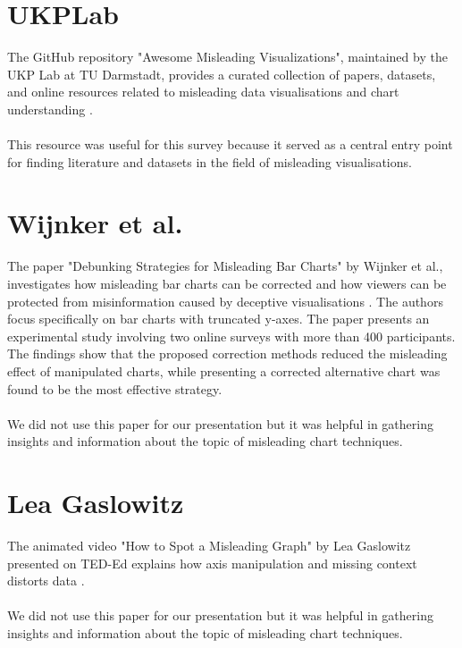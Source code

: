 \section{UKPLab}
The GitHub repository "Awesome Misleading Visualizations", maintained by the UKP Lab at TU Darmstadt, provides a curated collection of papers, datasets, and online resources related to misleading data visualisations and chart understanding \cite{UKPLab2025}. 
\\\\
This resource was useful for this survey because it served as a central entry point for finding literature and datasets in the field of misleading visualisations.

\section{Wijnker et al.}
The paper "Debunking Strategies for Misleading Bar Charts" by Wijnker et al., investigates how misleading bar charts can be corrected and how viewers can be protected from misinformation caused by deceptive visualisations \cite{Wijnker2022}. The authors focus specifically on bar charts with truncated y-axes.
The paper presents an experimental study involving two online surveys with more than 400 participants. The findings show that the proposed correction methods reduced the misleading effect of manipulated charts, while presenting a corrected alternative chart was found to be the most effective strategy.
\\\\
We did not use this paper for our presentation but it was helpful in gathering insights and information about the topic of misleading chart techniques.


\section{Lea Gaslowitz}
The animated video "How to Spot a Misleading Graph" by Lea Gaslowitz presented on TED-Ed explains how axis manipulation and missing context distorts data \cite{Gaslowitz2017}. 
\\\\
We did not use this paper for our presentation but it was helpful in gathering insights and information about the topic of misleading chart techniques.
